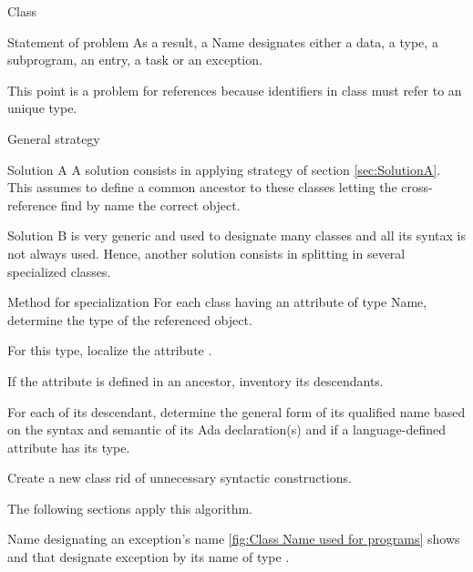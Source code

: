 \documentclass[a4paper]{prjdoc}
\begin{document}
\begin{asection}{Class }
\begin{asection}{Statement of problem}
     As a result, a Name designates either a data, a type, a subprogram, an entry, a task or an exception.
     
     This point is a problem for references because identifiers in class  must refer to an unique type.                  
     \end{asection} %
  
     \begin{asection}{General strategy}
     
        \begin{asection}{Solution A}
        A solution consists in applying strategy of section \ref{sec:SolutionA}. 
        This assumes to define a common ancestor to these classes letting 
        the cross-reference find by name the correct object.       
        \end{asection}
        
        \begin{asection}{Solution B}
         is very generic and used to designate many classes and all its syntax is not always used.
        Hence, another solution consists in splitting  in several  specialized classes.
        
           \begin{asection}{Method for  specialization}
           For each class having an attribute of type Name, 
           determine the type of the referenced object.
           
           For this type, localize the attribute .
           
           If the attribute  is defined in an ancestor,
           inventory its descendants.
           
           For each of its descendant, determine the general form of its qualified name based on the syntax and semantic of its Ada declaration(s)
           and if a language-defined attribute has its type.
           
           Create a new class  rid of unnecessary syntactic constructions.
                       
           \end{asection} %
           
           The following sections apply this algorithm.
           
           \begin{asection}{Name designating an exception's name}
           \ref{fig:Class Name used for programs} shows  and 
           that designate exception by its name of type .
           

\end{asection}
\end{asection}
\end{asection}
\end{asection}
\end{document}
